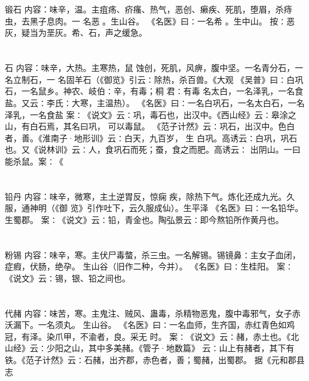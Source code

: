 \documentclass[12pt,UTF8]{ctexbook}
\begin{document}
\section{}锻石
内容：味辛，温。主疽疡、疥瘙、热气，恶创、癞疾、死肌，堕眉，杀痔虫，去黑子息肉。一 
名恶 。生山谷。 
《名医》曰∶一名希 。生中山。 
按∶恶灰，疑当为垩灰。希、石，声之缓急。 


\section{}石
内容：味辛，大热。主寒热，鼠 蚀创，死肌，风痹，腹中坚。一名青分石，一名立制石，一 
名固羊石（《御览》引云∶除热，杀百兽。《大观 
《吴普》曰∶白巩石，一名鼠乡。神农、岐伯∶辛，有毒；桐 
君∶有毒 
名太白，一名泽乳，一名食盐。又云∶李氏∶大寒，主温热）。 
《名医》曰∶一名白巩石，一名太白石，一名泽乳，一名食盐 
案∶《说文》云∶巩，毒石也，出汉中。《西山经》云∶皋涂之山，有白石焉，其名曰巩， 
可以毒鼠。 
《范子计然》云∶巩石，出汉中。色白者，善。《淮南子·地形训》云∶白天，九百岁， 
生 
白巩。高诱云∶白巩，巩石也。又《说林训》云∶人，食巩石而死；蚕，食之而肥。高诱云∶ 
出阴山。一曰能杀鼠。案∶《 


\section{}铅丹
内容：味辛，微寒，主土逆胃反，惊痫 疾，除热下气。炼化还成九光。久服，通神明（《御 
览》引作吐下，云久服成仙）。生平泽 
《名医》曰∶一名铅华。生蜀郡。 
案∶《说文》云∶铅，青金也。陶弘景云∶即今熬铅所作黄丹也。 


\section{}粉锡
内容：味辛，寒。主伏尸毒螫，杀三虫。一名解锡。锡镜鼻∶主女子血闭，症瘕，伏肠，绝孕。 
生山谷（旧作二种，今并）。 
《名医》曰∶生桂阳。 
案∶《说文》云∶锡，银、铅之间也。 


\section{}代赭
内容：味苦，寒。主鬼注、贼风、蛊毒，杀精物恶鬼，腹中毒邪气，女子赤沃漏下。一名须丸。 
生山谷。 
《名医》曰∶一名血师，生齐国，赤红青色如鸡冠，有泽。染爪甲，不渝者，良。采无 
时。 
案∶《说文》云∶赭，赤土也。《北山经》云∶少阳之山，其中多美赭。《管子·地数篇》 
云∶山上有赭者，其下有铁。《范子计然》云∶石赭，出齐郡，赤色者，善；蜀赭，出蜀郡。 
据《元和郡县志 
\end{document}
